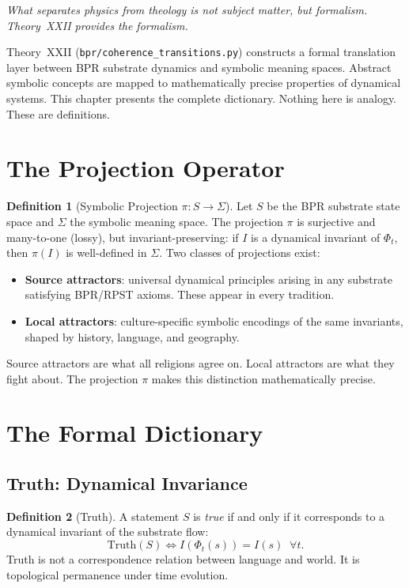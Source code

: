 \documentclass[12pt,oneside]{book}
\theoremstyle{definition}
\newtheorem{definition}{Definition}[chapter]
\begin{document}
\epigraph{\itshape What separates physics from theology is not subject matter,
but formalism. Theory~XXII provides the formalism.}{}

Theory~XXII (\texttt{bpr/coherence\_transitions.py}) constructs a formal
translation layer between BPR substrate dynamics and symbolic meaning spaces.
Abstract symbolic concepts are mapped to mathematically precise properties of
dynamical systems. This chapter presents the complete dictionary. Nothing here is
analogy. These are definitions.

\section{The Projection Operator}

\begin{definition}[Symbolic Projection $\pi: S \to \Sigma$]
  Let $S$ be the BPR substrate state space and $\Sigma$ the symbolic meaning space.
  The projection $\pi$ is surjective and many-to-one (lossy), but invariant-preserving:
  if $I$ is a dynamical invariant of $\Phi_t$, then $\pi(I)$ is well-defined in $\Sigma$.
  Two classes of projections exist:
  \begin{itemize}
    \item \textbf{Source attractors}: universal dynamical principles arising in any
      substrate satisfying BPR/RPST axioms. These appear in every tradition.
    \item \textbf{Local attractors}: culture-specific symbolic encodings of the same
      invariants, shaped by history, language, and geography.
  \end{itemize}
\end{definition}

Source attractors are what all religions agree on. Local attractors are what they
fight about. The projection $\pi$ makes this distinction mathematically precise.

\section{The Formal Dictionary}

\subsection{Truth: Dynamical Invariance}

\begin{definition}[Truth]
  A statement $S$ is \emph{true} if and only if it corresponds to a dynamical
  invariant of the substrate flow:
  \begin{equation}
    \mathrm{Truth}(S) \iff I(\Phi_t(s)) = I(s) \;\;\forall t.
  \end{equation}
  Truth is not a correspondence relation between language and world. It is
  topological permanence under time evolution.
\end{definition}
\end{document}
